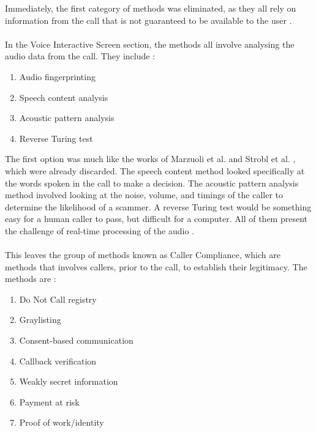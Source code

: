 \documentclass[main.tex]{subfiles}
\begin{document}
Immediately, the first category of methods was eliminated, as they all rely on information from the call that is not guaranteed to be available to the user \cite{cisco}.
\\\\
In the Voice Interactive Screen section, the methods all involve analysing the audio data from the call. They include \cite{cisco}:
\begin{enumerate}
	\item Audio fingerprinting
	\item Speech content analysis
	\item Acoustic pattern analysis
	\item Reverse Turing test
\end{enumerate}

The first option was much like the works of Marzuoli et al. \cite{marzuoli} and Strobl et al. \cite{strobl}, which were already discarded. The speech content method looked specifically at the words spoken in the call to make a decision. The acoustic pattern analysis method involved looking at the noise, volume, and timings of the caller to determine the likelihood of a scammer. A reverse Turing test would be something easy for a human caller to pass, but difficult for a computer. All of them present the challenge of real-time processing of the audio \cite{cisco}.
\\\\
This leaves the group of methods known as Caller Compliance, which are methods that involves callers, prior to the call, to establish their legitimacy. The methods are \cite{cisco}:
\begin{enumerate}
	\item Do Not Call registry
	\item Graylisting
	\item Consent-based communication
	\item Callback verification
	\item Weakly secret information
	\item Payment at risk
	\item Proof of work/identity
\end{enumerate}
\end{document}
